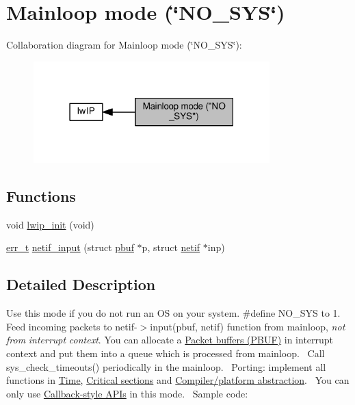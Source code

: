 \hypertarget{group__lwip__nosys}{}\section{Mainloop mode (\char`\"{}\+N\+O\+\_\+\+S\+Y\+S\char`\"{})}
\label{group__lwip__nosys}
Collaboration diagram for Mainloop mode (\char`\"{}\+N\+O\+\_\+\+S\+Y\+S\char`\"{})\+:
\nopagebreak
\begin{figure}[H]
\begin{center}
\leavevmode
\includegraphics[width=259pt]{group__lwip__nosys}
\end{center}
\end{figure}
\subsection*{Functions}
\begin{DoxyCompactItemize}
\item 
void \hyperlink{group__lwip__nosys_ga0c1a18439524d2f4a5e51d25c0ca2ce9}{lwip\+\_\+init} (void)
\item 
\hyperlink{group__infrastructure__errors_gaf02d9da80fd66b4f986d2c53d7231ddb}{err\+\_\+t} \hyperlink{group__lwip__nosys_ga5532f93d68c874fb99c681bff2165385}{netif\+\_\+input} (struct \hyperlink{structpbuf}{pbuf} $\ast$p, struct \hyperlink{structnetif}{netif} $\ast$inp)
\end{DoxyCompactItemize}


\subsection{Detailed Description}
Use this mode if you do not run an OS on your system. \#define N\+O\+\_\+\+S\+YS to 1. Feed incoming packets to netif-\/$>$input(pbuf, netif) function from mainloop, {\itshape not} {\itshape from} {\itshape interrupt} {\itshape context}. You can allocate a \hyperlink{group__pbuf}{Packet buffers (P\+B\+UF)} in interrupt context and put them into a queue which is processed from mainloop.~\newline
Call sys\+\_\+check\+\_\+timeouts() periodically in the mainloop.~\newline
Porting\+: implement all functions in \hyperlink{group__sys__time}{Time}, \hyperlink{group__sys__prot}{Critical sections} and \hyperlink{group__compiler__abstraction}{Compiler/platform abstraction}.~\newline
You can only use \hyperlink{group__callbackstyle__api}{Callback-\/style A\+P\+Is} in this mode.~\newline
Sample code\+:~\newline


